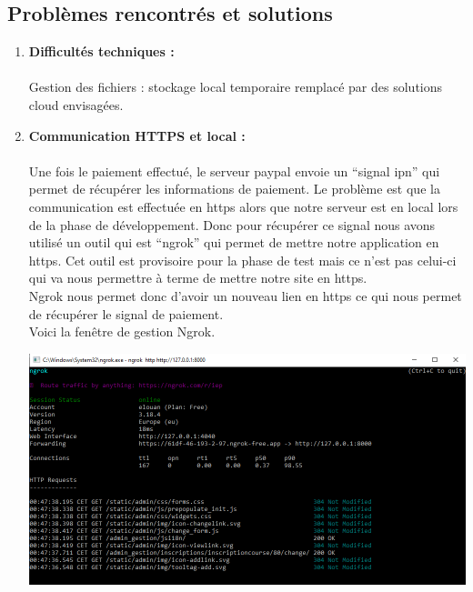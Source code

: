 \documentclass[12pt]{article} %
\begin{document}
	\subsection{Problèmes rencontrés et solutions}
        \begin{enumerate}
            \item \textbf{Difficultés techniques :}\\\\
                Gestion des fichiers : stockage local temporaire remplacé par des solutions cloud envisagées.

            \item \textbf{Communication HTTPS et local :}\\\\
                Une fois le paiement effectué, le serveur paypal envoie un “signal ipn” qui permet de récupérer les informations de paiement. Le problème est que la communication est effectuée en https alors que notre serveur est en local lors de la phase de développement. Donc pour récupérer ce signal nous avons utilisé un outil qui est “ngrok” qui permet de mettre notre application en https. Cet outil est provisoire pour la phase de test mais ce n’est pas celui-ci qui va nous permettre à terme de mettre notre site en https.\\
                Ngrok nous permet donc d’avoir un nouveau lien en https ce qui nous permet de récupérer le signal de paiement.\\ Voici la fenêtre de gestion Ngrok.


                \includegraphics[scale=0.6]{images/Capture_M1Ngrok.PNG}

        \end{enumerate}
    
\end{document}
